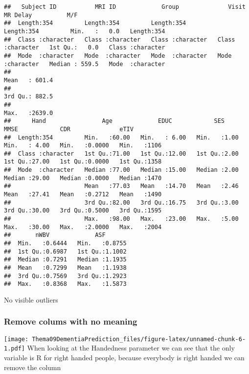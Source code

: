 \documentclass[
]{article}
\begin{document}
\begin{verbatim}
##   Subject ID           MRI ID             Group              Visit              MR Delay          M/F           
##  Length:354         Length:354         Length:354         Length:354         Min.   :   0.0   Length:354        
##  Class :character   Class :character   Class :character   Class :character   1st Qu.:   0.0   Class :character  
##  Mode  :character   Mode  :character   Mode  :character   Mode  :character   Median : 559.5   Mode  :character  
##                                                                              Mean   : 601.4                     
##                                                                              3rd Qu.: 882.5                     
##                                                                              Max.   :2639.0                     
##      Hand                Age             EDUC            SES            MMSE            CDR              eTIV     
##  Length:354         Min.   :60.00   Min.   : 6.00   Min.   :1.00   Min.   : 4.00   Min.   :0.0000   Min.   :1106  
##  Class :character   1st Qu.:71.00   1st Qu.:12.00   1st Qu.:2.00   1st Qu.:27.00   1st Qu.:0.0000   1st Qu.:1358  
##  Mode  :character   Median :77.00   Median :15.00   Median :2.00   Median :29.00   Median :0.0000   Median :1470  
##                     Mean   :77.03   Mean   :14.70   Mean   :2.46   Mean   :27.41   Mean   :0.2712   Mean   :1490  
##                     3rd Qu.:82.00   3rd Qu.:16.75   3rd Qu.:3.00   3rd Qu.:30.00   3rd Qu.:0.5000   3rd Qu.:1595  
##                     Max.   :98.00   Max.   :23.00   Max.   :5.00   Max.   :30.00   Max.   :2.0000   Max.   :2004  
##       nWBV             ASF        
##  Min.   :0.6444   Min.   :0.8755  
##  1st Qu.:0.6987   1st Qu.:1.1002  
##  Median :0.7291   Median :1.1935  
##  Mean   :0.7299   Mean   :1.1938  
##  3rd Qu.:0.7569   3rd Qu.:1.2923  
##  Max.   :0.8368   Max.   :1.5873
\end{verbatim}

No visible outliers

\hypertarget{remove-colums-with-no-meaning}{%
\subsubsection{Remove colums with no
meaning}\label{remove-colums-with-no-meaning}}

\texttt{[image: Thema09DementiaPrediction\_files/figure-latex/unnamed-chunk-6-1.pdf]}
When looking at the Handedness parameter we can see that the only
variable is R for right handed people, because everybody is right handed
we can remove the column
\end{document}
